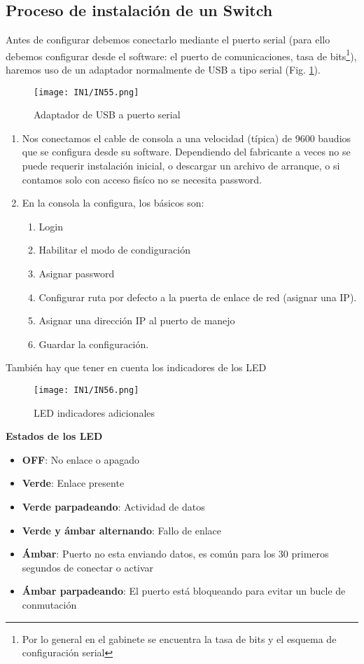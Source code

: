 \documentclass[
	12pt, %
	fleqn, %
	a4paper, %
	oneside, %
]{LegrandOrangeBook}
\begin{document}
\subsection{Proceso de instalación de un Switch}
Antes de configurar debemos conectarlo mediante el puerto serial (para ello debemos configurar desde el software: el puerto de comunicaciones, tasa de bits\footnote{Por lo general en el gabinete se encuentra la tasa de bits y el esquema de configuración serial}), haremos uso de un adaptador normalmente de USB a tipo serial (Fig. \ref{fig:cable usb serial}).
\begin{figure}[H]
\centering
\texttt{[image: IN1/IN55.png]}
\caption{Adaptador de USB a puerto serial}
\label{fig:cable usb serial}
\end{figure}
\begin{enumerate}
\item Nos conectamos el cable de consola a una velocidad (típica) de 9600 baudios que se configura desde su software. Dependiendo del fabricante a veces no se puede requerir instalación inicial, o descargar un archivo de arranque, o si contamos solo con acceso fisíco no se necesita password.
\item En la consola la configura, los básicos son:
\begin{enumerate}
\item Login
\item Habilitar el modo de condiguración
\item Asignar password
\item Configurar ruta por defecto a la puerta de enlace de red (asignar una IP).
\item Asignar una dirección IP al puerto de manejo
\item Guardar la configuración.
\end{enumerate}
\end{enumerate}
También hay que tener en cuenta los indicadores de los LED
\begin{figure}[H]
\centering
\texttt{[image: IN1/IN56.png]}
\caption{LED indicadores adicionales}
\end{figure}
\textbf{Estados de los LED}\\
\begin{itemize}
\item \textbf{OFF}: No enlace o apagado
\item \textbf{Verde}: Enlace presente
\item \textbf{Verde parpadeando}: Actividad de datos
\item \textbf{Verde y ámbar alternando}: Fallo de enlace
\item \textbf{Ámbar}: Puerto no esta enviando datos, es común para los 30 primeros segundos de conectar o activar
\item \textbf{Ámbar parpadeando}: El puerto está bloqueando para evitar un bucle de conmutación
\end{itemize}
\end{document}
